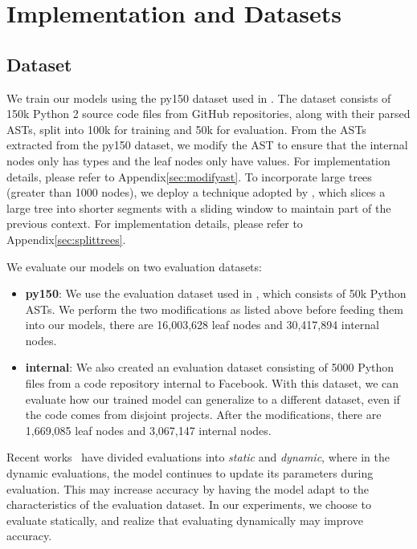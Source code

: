 \documentclass[nonacm, sigconf]{acmart}
\begin{document}
 
\section{Implementation and Datasets}
\label{sec:implementation}

\subsection{Dataset}
We train our models using the py150 dataset 
\cite{py150} used in \citet{raychev2016probabilistic-deep3-eth-dt}.
The dataset consists of 150k Python 2 source code files from GitHub repositories, along with their parsed ASTs, split into 100k for training and 50k for evaluation.
From the ASTs extracted from the py150 dataset, we modify the AST to ensure that the internal nodes only has types and the leaf nodes only have values. For implementation details, please refer to Appendix\ref{sec:modifyast}. To incorporate large trees (greater than 1000 nodes), we deploy a technique adopted by \cite{alrfou2018characterlevel}, which slices a large tree into shorter segments with a sliding window to maintain part of the previous context. For implementation details, please refer to Appendix\ref{sec:splittrees}. 

We evaluate our models on two evaluation datasets:
\begin{itemize}
    \item \textbf{py150}: We use the evaluation dataset used in \citet{raychev2016probabilistic-deep3-eth-dt}, which consists of 50k Python ASTs. We perform the two modifications as listed above before feeding them into our models, there are 16,003,628 leaf nodes and 30,417,894 internal nodes.
    \item \textbf{internal}: We also created an evaluation dataset consisting of 5000 Python files from a code repository internal to Facebook. With this dataset, we can evaluate how our trained model can generalize to a different dataset, even if the code comes from disjoint projects. After the modifications, there are 1,669,085 leaf nodes and 3,067,147 internal nodes. 
\end{itemize}
Recent works~\citep{karampatsis2020big-bpe,hellendoorn2017are-deep-best} have divided evaluations into \textit{static} and \textit{dynamic}, where in the dynamic evaluations, the model continues to update its parameters during evaluation. This may increase accuracy by having the model adapt to the characteristics of the evaluation dataset. In our experiments, we choose to evaluate statically, and realize that evaluating dynamically may improve accuracy.
\end{document}
